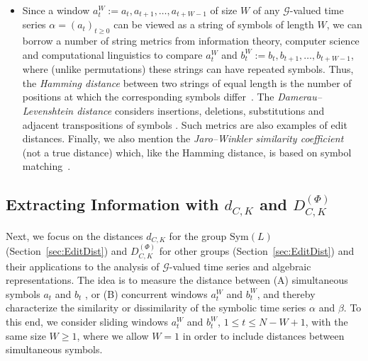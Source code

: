 \documentclass{article}
\begin{document}
\begin{itemize}
\item[\textbf{(iii)}] Since a window $a_{t}^{W}:=a_{t},a_{t+1},\ldots,a_{t+W-1}$ of size 
$W$ of any $\mathcal{G}$-valued time series $\alpha =(a_{t})_{t\geq 0}$ can
be viewed as a string of symbols of length $W$, we can borrow a number of
string metrics from information theory, computer science and computational
linguistics to compare $a_{t}^{W}$ and $%
b_{t}^{W}:=b_{t},b_{t+1},\ldots,b_{t+W-1} $, where (unlike permutations) these
strings can have repeated symbols. Thus, the \textit{Hamming distance}
between two strings of equal length is the number of positions at which the
corresponding symbols differ~\cite{Hamming1950}. The \textit{%
Damerau--Levenshtein distance} considers insertions, deletions,
substitutions and adjacent transpositions of symbols \cite%
{Damerau1964,Levenshtein1966,Cormen2009}. Such metrics are also examples of
edit distances. Finally, we also mention the \textit{Jaro--Winkler
similarity coefficient} (not a true distance) which, like the Hamming
distance, is based on symbol matching~\cite{Jaro1989,Winkler1990}.
\end{itemize}

\subsection{Extracting Information with $d_{C,K}$ and $D_{C,K}^{(\Phi )}$}

\label{sec:ExtractInfo}

Next, we focus on the distances $d_{C,K}$ for the group $\mathrm{Sym}(L)$
(Section~\ref{sec:EditDist}) and $D_{C,K}^{(\Phi )}$ for other groups
(Section~\ref{sec:EditDist}) and their applications to the analysis of $%
\mathcal{G}$-valued time series and algebraic representations. The idea is
to measure the distance between (A) simultaneous symbols $a_{t}$ and $b_{t}$%
, or (B) concurrent windows $a_{t}^{W}$ and $b_{t}^{W}$, and thereby
characterize the similarity or dissimilarity of the symbolic time series $%
\alpha $ and $\beta $. To this end, we consider sliding windows $a_{t}^{W}$
and $b_{t}^{W}$, $1\leq t\leq N-W+1$, with the same size $W\geq 1$, where we
allow $W=1$ in order to include distances between simultaneous symbols.
\end{document}
